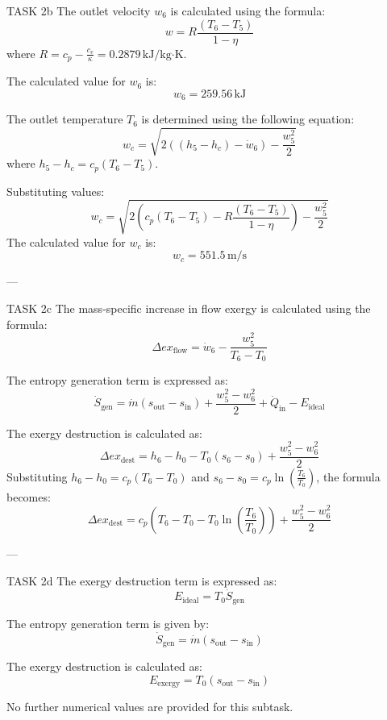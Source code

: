 TASK 2b  
The outlet velocity \( w_6 \) is calculated using the formula:  
\[
w = R \frac{(T_6 - T_5)}{1 - \eta}
\]  
where \( R = c_p - \frac{c_v}{\kappa} = 0.2879 \, \text{kJ/kg·K} \).  

The calculated value for \( w_6 \) is:  
\[
w_6 = 259.56 \, \text{kJ}
\]  

The outlet temperature \( T_6 \) is determined using the following equation:  
\[
w_c = \sqrt{2 \left( (h_5 - h_c) - \dot{w}_6 \right) - \frac{w_5^2}{2}}
\]  
where \( h_5 - h_c = c_p (T_6 - T_5) \).  

Substituting values:  
\[
w_c = \sqrt{2 \left( c_p (T_6 - T_5) - R \frac{(T_6 - T_5)}{1 - \eta} \right) - \frac{w_5^2}{2}}
\]  
The calculated value for \( w_c \) is:  
\[
w_c = 551.5 \, \text{m/s}
\]  

---

TASK 2c  
The mass-specific increase in flow exergy is calculated using the formula:  
\[
\Delta ex_{\text{flow}} = \dot{w}_6 - \frac{w_5^2}{T_6 - T_0}
\]  

The entropy generation term is expressed as:  
\[
\dot{S}_{\text{gen}} = \dot{m} \left( s_{\text{out}} - s_{\text{in}} \right) + \frac{w_5^2 - w_6^2}{2} + \dot{Q}_{\text{in}} - E_{\text{ideal}}
\]  

The exergy destruction is calculated as:  
\[
\Delta ex_{\text{dest}} = h_6 - h_0 - T_0 (s_6 - s_0) + \frac{w_5^2 - w_6^2}{2}
\]  
Substituting \( h_6 - h_0 = c_p (T_6 - T_0) \) and \( s_6 - s_0 = c_p \ln \left( \frac{T_6}{T_0} \right) \), the formula becomes:  
\[
\Delta ex_{\text{dest}} = c_p (T_6 - T_0 - T_0 \ln \left( \frac{T_6}{T_0} \right)) + \frac{w_5^2 - w_6^2}{2}
\]  

---

TASK 2d  
The exergy destruction term is expressed as:  
\[
E_{\text{ideal}} = T_0 \dot{S}_{\text{gen}}
\]  

The entropy generation term is given by:  
\[
\dot{S}_{\text{gen}} = \dot{m} \left( s_{\text{out}} - s_{\text{in}} \right)
\]  

The exergy destruction is calculated as:  
\[
E_{\text{exergy}} = T_0 \left( s_{\text{out}} - s_{\text{in}} \right)
\]  

No further numerical values are provided for this subtask.
